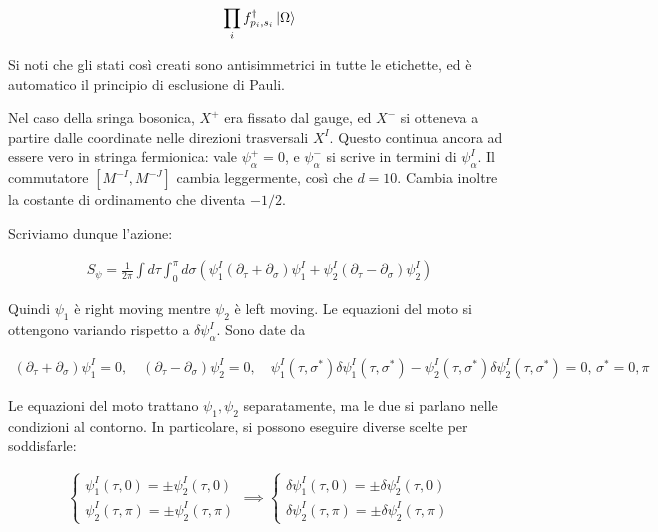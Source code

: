 \documentclass{report}
\begin{document}
\begin{align}
    \prod_i f^\dagger_{p_i, s_i} \ket{\Omega}
\end{align}

Si noti che gli stati così creati sono antisimmetrici in tutte le etichette, ed è automatico il principio di esclusione di Pauli. 

Nel caso della sringa bosonica, \(X^+\) era fissato dal gauge, ed \(X^-\) si otteneva a partire dalle coordinate nelle direzioni trasversali \(X^I\). Questo continua ancora ad essere vero in stringa fermionica: vale \(\psi^+_\alpha =0\), e \(\psi^-_\alpha\) si scrive in termini di \(\psi^I_\alpha\). Il commutatore \([M^{-I}, M^{-J}]\) cambia leggermente, così che \(d=10\). Cambia inoltre la costante di ordinamento che diventa \(-1/2\). 

Scriviamo dunque l'azione: 

\begin{align}
    S_\psi = \frac{1}{2\pi}\int d\tau \int_0^\pi d\sigma (\psi_1^I (\partial_\tau + \partial_\sigma)\psi_1^I + \psi_2^I (\partial_\tau - \partial_\sigma)\psi_2^I)
\end{align}

Quindi \(\psi_1\) è right moving mentre \(\psi_2\) è left moving. Le equazioni del moto si ottengono variando rispetto a \(\delta \psi^I_\alpha\). Sono date da 

\begin{align}
    (\partial_\tau + \partial_\sigma)\psi^I_1 = 0, \quad (\partial_\tau - \partial_\sigma)\psi_2^I = 0, \quad  \psi_1^I(\tau, \sigma^*) \delta \psi_1^I(\tau, \sigma^*) - \psi_2^I(\tau, \sigma^*)\delta\psi_2^I(\tau, \sigma^*) = 0, \, \sigma^* = 0, \pi 
\end{align}

Le equazioni del moto trattano \(\psi_1, \psi_2\) separatamente, ma le due si parlano nelle condizioni al contorno. In particolare, si possono eseguire diverse scelte per soddisfarle: 

\begin{align}
    \begin{cases}
    \psi_1^I (\tau, 0) = \pm \psi_2^I (\tau, 0) \\
    \psi_2^I (\tau, \pi) = \pm \psi_2^I (\tau, \pi)
    \end{cases} \implies \begin{cases}
        \delta\psi_1^I (\tau, 0) = \pm \delta\psi_2^I (\tau, 0) \\
        \delta\psi_2^I (\tau, \pi) = \pm \delta\psi_2^I (\tau, \pi)
    \end{cases}
\end{align}
\end{document}
